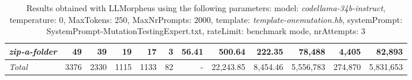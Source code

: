 \begin{table*}
{\begin{tabular}{l||r|r|r|r|r|r||r|r||r|r|r}
   \hline
   \textit{zip-a-folder} & 49 & 39 & 19 & 17 & 3 & 56.41 & 500.64 & 222.35 & 78,488 & 4,405 & 82,893 \\ 
   \hline
   \textit{Total} & 3376 & 2330 & 1115 & 1133 & 82 & - & 22,243.85  & 8,454.46 & 5,556,783 & 274,870 & 5,831,653 \\ 
 \end{tabular}
 }
 \caption{Results obtained with LLMorpheus using the following parameters: 
   model: \textit{codellama-34b-instruct}, 
   temperature: 0, 
   MaxTokens: 250, 
   MaxNrPrompts: 2000, 
   template: \textit{template-onemutation.hb}, 
   systemPrompt: SystemPrompt-MutationTestingExpert.txt, 
   rateLimit: benchmark mode, 
   nrAttempts: 3  
 }
\end{table*}

